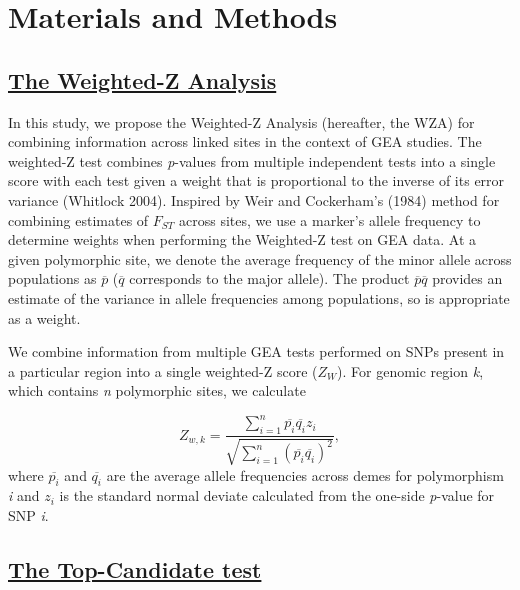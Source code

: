 \documentclass[11pt,twoside,lineno]{GSA_format}
\begin{document}
\section{Materials and Methods}
\label{sec:materials:methods}

\subsection{\underline{The Weighted-Z Analysis}} 

In this study, we propose the Weighted-Z Analysis (hereafter, the WZA) for combining information across linked sites in the context of GEA studies. The weighted-Z test combines \textit{p}-values from multiple independent tests into a single score with each test given a weight that is proportional to the inverse of its error variance (Whitlock 2004). Inspired by Weir and Cockerham's (1984) method for combining estimates of $F_{ST}$ across sites, we use a marker's allele frequency to determine weights when performing the Weighted-Z test on GEA data. At a given polymorphic site, we denote the average frequency of the minor allele across populations as $\overline{p}$ ($\overline{q}$ corresponds to the major allele). The product $\overline{p}\overline{q}$ provides an estimate of the variance in allele frequencies among populations, so is appropriate as a weight.

We combine information from multiple GEA tests performed on SNPs present in a particular region into a single weighted-Z score ($Z_W$). For genomic region \textit{k}, which contains \textit{n} polymorphic sites, we calculate 

\begin{equation}
\label{weightedZ}
Z_{w,k} =  \frac {\sum\limits_{i=1}^n \overline{p_i} \overline{q_i}z_i}{\sqrt{ \sum\limits_{i=1}^n (\overline{p_i}\overline{q_i})^2} },
\end{equation}
where $\overline{p_i}$ and $\overline{q_i}$ are the average allele frequencies across demes for polymorphism \textit{i} and $z_i$ is the standard normal deviate calculated from the one-side \textit{p}-value for SNP \textit{i}.



\subsection{\underline{The Top-Candidate test}} 
\end{document}
